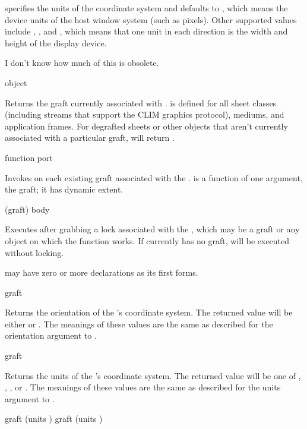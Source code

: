  specifies the units of the coordinate system and defaults to
, which means the device units of the host window system (such as
pixels).  Other supported values include , , and
, which means that one unit in each direction is the width and
height of the display device.

 {I don't know how much of this is obsolete.}

 {object}

Returns the graft currently associated with .   is
defined for all sheet classes (including streams that support the CLIM
graphics protocol), mediums, and application frames.  For degrafted sheets or
other objects that aren't currently associated with a particular graft,
 will return .

 {function port}

Invokes  on each existing graft associated with the 
.   is a function of one argument, the graft; it has
dynamic extent.

 {(graft) \body body} 

Executes  after grabbing a lock associated with the 
, which may be a graft or any object on which the function
 works.  If  currently has no graft,  will
be executed without locking.

 may have zero or more declarations as its first forms.


 {graft}

Returns the orientation of the  's coordinate system.
The returned value will be either  or .  The meanings
of these values are the same as described for the orientation argument to
.

 {graft}

Returns the units of the  's coordinate system.  The
returned value will be one of , , , or
.  The meanings of these values are the same as described for
the units argument to .

 {graft \key (units )}
 {graft \key (units )}

